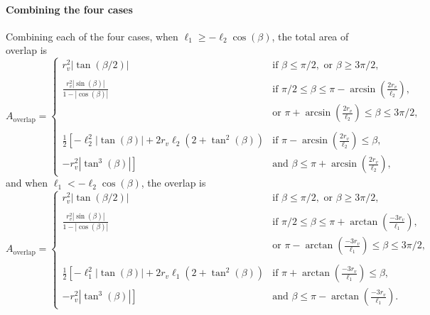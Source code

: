 \paragraph{Combining the four cases}
Combining each of the four cases, when $\ell_1 \geq -\ell_2 \cos(\beta)$,  the total area of overlap is
\begin{equation*}
A_{\text{overlap}} = 
\begin{cases}
r_v^2 \left|\tan(\beta/2)\right| \quad &\text{if } \beta \leq \pi/2, \text{ or } \beta \geq 3\pi/2,\\\\
\displaystyle \frac{r_v^2 \left|\sin(\beta)\right|}{1-\left|\cos(\beta) \right|} &\text{if } \pi/2  \leq \beta \leq  \pi-\arcsin\left( \frac{2r_v}{\ell_2} \right),\\
&\text{or }\pi+\arcsin\left( \frac{2r_v}{\ell_2} \right) \leq \beta \leq 3\pi/2,\\\\
\displaystyle \frac{1}{2} \left[-\ell_2^2 \left|\tan(\beta)\right| + 2r_v \ell_2(2+\tan^2(\beta))\right.  &\text{if }\pi-\arcsin\left( \frac{2r_v}{\ell_2} \right) \leq \beta,\\
\left.  - r_v^2 \left|\tan^3(\beta)\right| \right]   &\text{and } \beta \leq \pi +\arcsin\left( \frac{2r_v}{\ell_2} \right),
\end{cases}
\end{equation*}
and when $\ell_1  < -\ell_2 \cos(\beta)$, the overlap is
\begin{equation*}
A_{\text{overlap}} = 
\begin{cases}
r_v^2 \left|\tan(\beta/2)\right| \quad &\text{if } \beta \leq \pi/2, \text{ or } \beta \geq 3\pi/2,\\\\
\displaystyle \frac{r_v^2 \left|\sin(\beta)\right|}{1-\left|\cos(\beta) \right|} &\text{if } \pi/2  \leq \beta \leq  \pi+\arctan\left( \frac{-3r_v}{\ell_1} \right),\\
&\text{or }\pi-\arctan\left( \frac{-3r_v}{\ell_1} \right) \leq \beta \leq 3\pi/2,\\\\
\displaystyle \frac{1}{2} \left[-\ell_1^2 \left|\tan(\beta)\right| + 2r_v \ell_1(2+\tan^2(\beta))\right.   &\text{if }\pi+\arctan\left( \frac{-3r_v}{\ell_1} \right) \leq \beta,\\
\left.- r_v^2 \left|\tan^3(\beta)\right| \right]   &\text{and } \beta \leq \pi -\arctan\left( \frac{-3r_v}{\ell_1} \right).
\end{cases}
\end{equation*}

